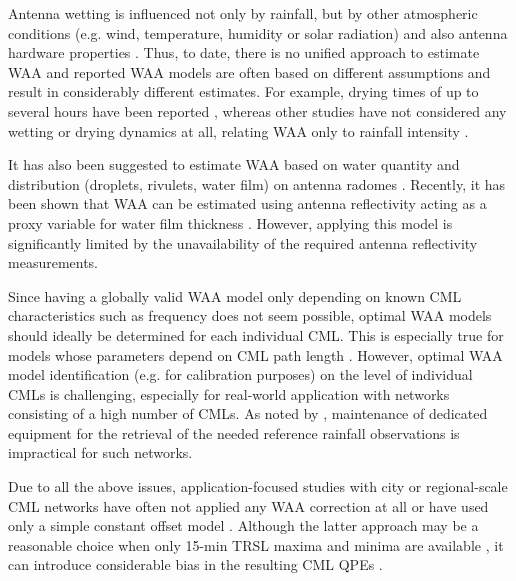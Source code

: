 \documentclass{ctuthesis}\usepackage[]{graphicx}\usepackage[]{color}
\begin{document}
Antenna wetting is influenced not only by rainfall, but by other atmospheric conditions (e.g. wind, temperature, humidity or solar radiation) and also  antenna hardware properties \citep[e.g. antenna radome material or coating;][]{lethMeasurementCampaignAssess2018}. Thus, to date, there is no unified approach to estimate WAA and reported WAA models are often based on different assumptions and result in considerably different estimates. For example, drying times of up to several hours have been reported \citep{schleissQuantificationModelingWetAntenna2013}, whereas other studies have not considered any wetting or drying dynamics at all, relating WAA only to rainfall intensity \citep{valtrExcessAttenuationCaused2019, kharadlyEffectWetAntenna2001}. 

It has also been suggested to estimate WAA based on water quantity and distribution (droplets, rivulets, water film) on antenna radomes \citep{leijnseMicrowaveLinkRainfall2008, manciniImpactWetSBand2019}. Recently, it has been shown that WAA can be estimated using antenna reflectivity acting as a proxy variable for water film thickness \citep{moroderModelingWetAntenna2019}. However, applying this model is significantly limited by the unavailability of the required antenna reflectivity measurements.

Since having a globally valid WAA model only depending on known CML characteristics such as frequency does not seem possible, optimal WAA models should ideally be determined for each individual CML. This is especially true for models whose parameters depend on CML path length \citep[e.g.][]{kharadlyEffectWetAntenna2001}. However, optimal WAA model identification (e.g. for calibration purposes) on the level of individual CMLs is challenging, especially for real-world application with networks consisting of a high number of CMLs. As noted by \citep{ostrometzkyWetAntennaEffectFactor2018}, maintenance of dedicated equipment for the retrieval of the needed reference rainfall observations is impractical for such networks. 

Due to all the above issues, application-focused studies with city or regional-scale CML networks have often not applied any WAA correction at all \citep{chwalaPrecipitationObservationUsing2012, smiatekPotentialCommercialMicrowave2017} or have used only a simple constant offset model \citep{overeemMeasuringUrbanRainfall2011, roversiCommercialMicrowaveLinks2020, fenclAtmosphericObservationsEband2020}. Although the latter approach may be a reasonable choice when only 15-min TRSL maxima and minima are available \citep{chwalaCommercialMicrowaveLink2019}, it can introduce considerable bias in the resulting CML QPEs \citep{fenclQuantifyingWetAntenna2019}.
\end{document}
